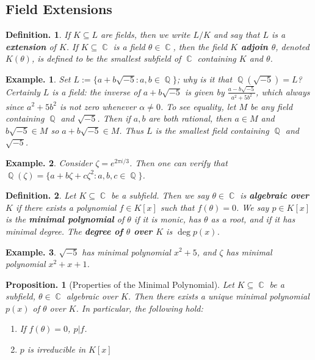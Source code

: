 \documentclass[11pt, a4paper]{memoir}
\DeclareMathOperator{\Q}{{\mathbb{Q}}}
\DeclareMathOperator{\C}{{\mathbb{C}}}
\theoremstyle{change}
\newtheorem{proposition}[theorem]{Proposition.}
\theoremstyle{plain}
\theoremstyle{nonumberplain}
\newtheorem{definition}{Definition.}
\newtheorem{example}{Example.}
\newcommand{\mbf}[1]{{\boldmath\bfseries #1}}
\numberwithin{equation}{section}
\begin{document}
\subsection{Field Extensions}
\begin{definition}
    If $K\subseteq L$ are fields, then we write $L/K$ and say that $L$ is a \mbf{extension} of $K$.
    If $K\subseteq\C$ is a field $\theta\in\C$, then the field \mbf{$K$ adjoin $\theta$}, denoted $K(\theta)$, is defined to be the smallest subfield of $\C$ containing $K$ and $\theta$.
\end{definition}
\begin{example}
    Set $L:=\{a+b\sqrt{-5}:a,b\in\Q\}$; why is it that $\Q(\sqrt{-5})=L$?
    Certainly $L$ is a field: the inverse of $a+b\sqrt{-5}$ is given by $\frac{a-b\sqrt{-5}}{a^2+5b^2}$, which always since $a^2+5b^2$ is not zero whenever $\alpha\neq 0$.
    To see equality, let $M$ be any field containing $\Q$ and $\sqrt{-5}$.
    Then if $a,b$ are both rational, then $a\in M$ and $b\sqrt{-5}\in M$ so $a+b\sqrt{-5}\in M$.
    Thus $L$ is the smallest field containing $\Q$ and $\sqrt{-5}$.
\end{example}
\begin{example}
    Consider $\zeta=e^{2\pi i/3}$.
    Then one can verify that $\Q(\zeta)=\{a+b\zeta+c\zeta^2:a,b,c\in\Q\}$.
\end{example}
\begin{definition}
    Let $K\subseteq\C$ be a subfield.
    Then we say $\theta\in\C$ is \mbf{algebraic over $K$} if there exists a polynomial $f\in K[x]$ such that $f(\theta)=0$.
    We say $p\in K[x]$ is the \mbf{minimal polynomial} of $\theta$ if it is monic, has $\theta$ as a root, and if it has minimal degree.
    The \mbf{degree of $\theta$ over $K$} is $\deg p(x)$.
\end{definition}
\begin{example}
    $\sqrt{-5}$ has minimal polynomial $x^2+5$, and $\zeta$ has minimal polynomial $x^2+x+1$.
\end{example}
\begin{proposition}[Properties of the Minimal Polynomial]
    Let $K\subseteq\C$ be a subfield, $\theta\in\C$ algebraic over $K$.
    Then there exists a unique minimal polynomial $p(x)$ of $\theta$ over $K$.
    In particular, the following hold:
    \begin{enumerate}[nolistsep]
        \item If $f(\theta)=0$, $p|f$.
        \item $p$ is irreducible in $K[x]$
    \end{enumerate}
\end{proposition}
\end{document}

